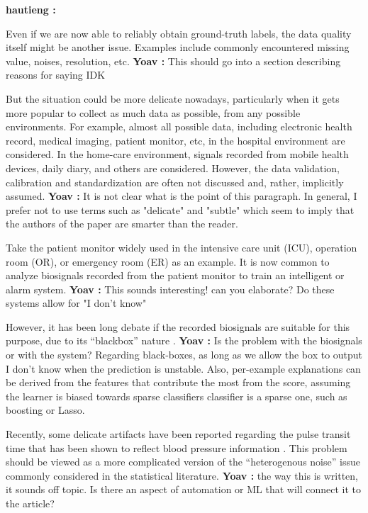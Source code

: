 \documentclass[fleqn,10pt]{wlscirep}
\newcommand{\comment}[3]{{\color{#1} {\bf #2 :} #3}}
\newcommand{\hautieng}[1]{\comment{blue}{hautieng}{#1}}
\newcommand{\yoav}[1]{\comment{red}{Yoav}{#1}}
\begin{document}
\hautieng{


Even if we are now able to reliably obtain ground-truth labels, the data quality itself might be another issue. Examples include commonly encountered missing value, noises, resolution, etc. 
\yoav{This should go into a section describing reasons for saying IDK}

But the situation could be more delicate nowadays, particularly when it gets more popular to collect as much data as possible, from any possible environments. For example, almost all possible data, including electronic health record, medical imaging, patient monitor, etc, in the hospital environment are considered. In the home-care environment, signals recorded from mobile health devices, daily diary, and others are considered. However, the data validation, calibration and standardization are often not discussed and, rather, implicitly assumed. 
\yoav{It is not clear what is the point of this paragraph.  In general, I prefer not to use terms such as "delicate" and "subtle" which seem to imply that the authors of the paper are smarter than the reader.}

Take the patient monitor widely used in the intensive care unit (ICU), operation room (OR), or emergency room (ER) as an example. It is now common to analyze biosignals recorded from the patient monitor to train an intelligent \cite{Johnson2016} or alarm \cite{fleischman2019emergency} system.
\yoav{This sounds interesting! can you elaborate? Do these systems allow for "I don't know"}

However, it has been long debate if the recorded biosignals are suitable for this purpose, due to its ``blackbox'' nature \cite{Feldman2006,Shelley2016,Cannesson2016}. 
\yoav{Is the problem with the biosignals or with the system? Regarding black-boxes, as long as we allow the box to output I don't know when the prediction is unstable. Also, per-example explanations can be derived from the features that contribute the most from the score, assuming the learner is biased towards sparse classifiers classifier is a sparse one, such as boosting or Lasso.}

Recently, some delicate artifacts have been reported \cite{lin2019unexpected} regarding the pulse transit time that has been shown to reflect blood pressure information \cite{gesche2012continuous}. This problem should be viewed as a more complicated version of the ``heterogenous noise'' issue commonly considered in the statistical literature.
\yoav{the way this is written, it sounds off topic. Is there an aspect of automation or ML that will connect it to the article?}

}
\end{document}
